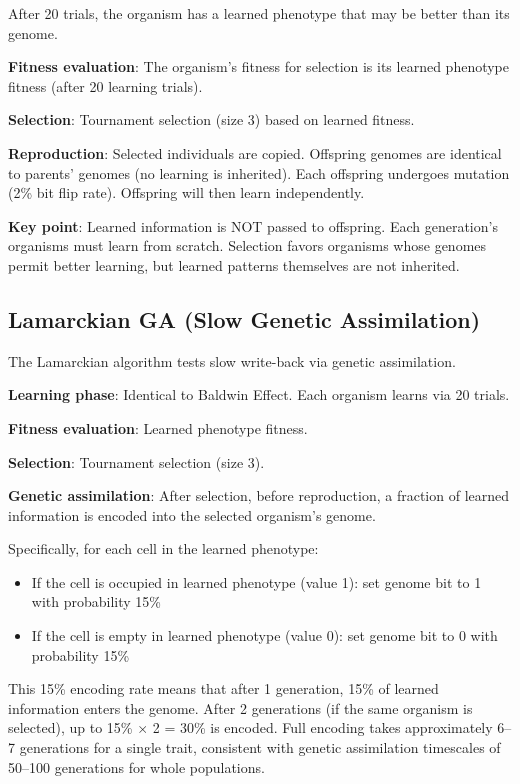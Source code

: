 \documentclass[twocolumn]{article}
\begin{document}
After 20 trials, the organism has a learned phenotype that may be better than its genome.

\textbf{Fitness evaluation}: The organism's fitness for selection is its learned phenotype fitness (after 20 learning trials).

\textbf{Selection}: Tournament selection (size 3) based on learned fitness.

\textbf{Reproduction}: Selected individuals are copied. Offspring genomes are identical to parents' genomes (no learning is inherited). Each offspring undergoes mutation (2\% bit flip rate). Offspring will then learn independently.

\textbf{Key point}: Learned information is NOT passed to offspring. Each generation's organisms must learn from scratch. Selection favors organisms whose genomes permit better learning, but learned patterns themselves are not inherited.

\subsection*{Lamarckian GA (Slow Genetic Assimilation)}

The Lamarckian algorithm tests slow write-back via genetic assimilation.

\textbf{Learning phase}: Identical to Baldwin Effect. Each organism learns via 20 trials.

\textbf{Fitness evaluation}: Learned phenotype fitness.

\textbf{Selection}: Tournament selection (size 3).

\textbf{Genetic assimilation}: After selection, before reproduction, a fraction of learned information is encoded into the selected organism's genome.

Specifically, for each cell in the learned phenotype:
\begin{itemize}
\item If the cell is occupied in learned phenotype (value 1): set genome bit to 1 with probability 15\%
\item If the cell is empty in learned phenotype (value 0): set genome bit to 0 with probability 15\%
\end{itemize}

This 15\% encoding rate means that after 1 generation, 15\% of learned information enters the genome. After 2 generations (if the same organism is selected), up to 15\% $\times$ 2 = 30\% is encoded. Full encoding takes approximately 6--7 generations for a single trait, consistent with genetic assimilation timescales of 50--100 generations for whole populations.
\end{document}
